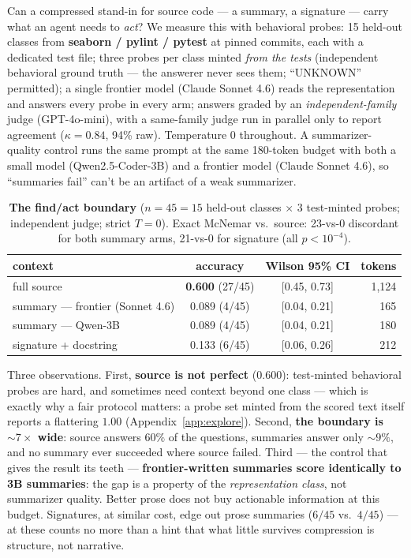 \documentclass{article}
\newcommand{\ci}[2]{[#1, #2]}
\begin{document}
Can a compressed stand-in for source code --- a summary, a signature --- carry what an agent needs
to \emph{act}? We measure this with behavioral probes: 15 held-out classes from
\textbf{seaborn / pylint / pytest} at pinned commits, each with a dedicated test file; three probes
per class minted \emph{from the tests} (independent behavioral ground truth --- the answerer never
sees them; ``UNKNOWN'' permitted); a single frontier model (Claude Sonnet 4.6) reads the
representation and answers every probe in every arm; answers graded by an \emph{independent-family}
judge (GPT-4o-mini), with a same-family judge run in parallel only to report agreement
($\kappa{=}0.84$, 94\% raw). Temperature 0 throughout. A summarizer-quality control runs the same
prompt at the same 180-token budget with both a small model (Qwen2.5-Coder-3B) and a frontier
model (Claude Sonnet 4.6), so ``summaries fail'' can't be an artifact of a weak summarizer.

\begin{table}[t]
  \centering\small
  \caption{\textbf{The find/act boundary} ($n{=}45 = 15$ held-out classes $\times$ 3 test-minted
  probes; independent judge; strict $T{=}0$). Exact McNemar vs.\ source: 23-vs-0 discordant for
  both summary arms, 21-vs-0 for signature (all $p < 10^{-4}$).}
  \label{tab:findact}
  \begin{tabular}{@{}lccr@{}}
    \toprule
    context & accuracy & Wilson 95\% CI & tokens \\
    \midrule
    full source & \textbf{0.600} (27/45) & \ci{0.45}{0.73} & 1{,}124 \\
    summary --- frontier (Sonnet 4.6) & 0.089 (4/45) & \ci{0.04}{0.21} & 165 \\
    summary --- Qwen-3B & 0.089 (4/45) & \ci{0.04}{0.21} & 180 \\
    signature + docstring & 0.133 (6/45) & \ci{0.06}{0.26} & 212 \\
    \bottomrule
  \end{tabular}
\end{table}

Three observations. First, \textbf{source is not perfect} ($0.600$): test-minted behavioral probes
are hard, and sometimes need context beyond one class --- which is exactly why a fair protocol
matters: a probe set minted from the scored text itself reports a flattering $1.00$
(Appendix~\ref{app:explore}). Second, \textbf{the boundary is ${\sim}7\times$ wide}: source answers $60\%$ of the questions,
summaries answer only ${\sim}9\%$, and no summary ever succeeded where source failed. Third ---
the control that gives the result its teeth --- \textbf{frontier-written summaries score
identically to 3B summaries}: the gap is a property of the \emph{representation class}, not
summarizer quality. Better prose does not buy actionable information at this budget. Signatures,
at similar cost, edge out prose summaries ($6/45$ vs.\ $4/45$) --- at these counts no more than a hint that what
little survives compression is structure, not narrative.
\end{document}

